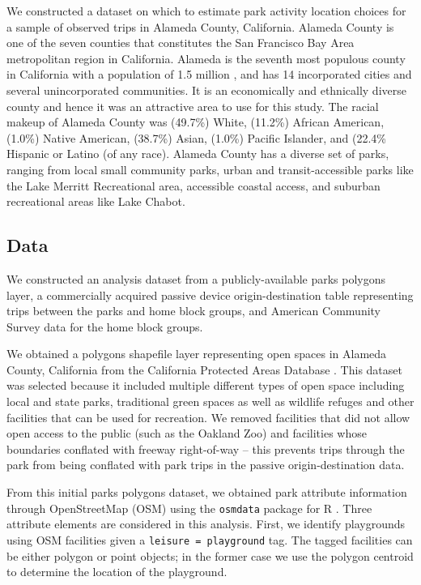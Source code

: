 \documentclass[]{elsarticle} %
\begin{document}
We constructed a dataset on which to estimate park activity location choices for
a sample of observed trips in Alameda County, California. Alameda County is one
of the seven counties that constitutes the San Francisco Bay Area metropolitan
region in California. Alameda is the seventh most populous county in California
with a population of 1.5 million \citep{alamedafacts}, and has 14 incorporated cities
and several unincorporated communities. It is an economically and ethnically
diverse county and hence it was an attractive area to use for this study. The
racial makeup of Alameda County was (49.7\%) White, (11.2\%) African American,
(1.0\%) Native American, (38.7\%) Asian, (1.0\%) Pacific Islander, and (22.4\%
Hispanic or Latino (of any race). Alameda County has a diverse set of parks,
ranging from local small community parks, urban and transit-accessible parks
like the Lake Merritt Recreational area, accessible coastal access, and suburban
recreational areas like Lake Chabot.

\hypertarget{data}{%
\subsection{Data}\label{data}}

We constructed an analysis dataset from a publicly-available parks polygons
layer, a commercially acquired passive device origin-destination table
representing trips between the parks and home block groups, and American
Community Survey data for the home block groups.

We obtained a polygons shapefile layer representing open spaces in Alameda
County, California from the California Protected Areas Database \citep{cpad2019}.
This dataset was selected because it included multiple different types of open
space including local and state parks, traditional green spaces as well as
wildlife refuges and other facilities that can be used for recreation. We
removed facilities that did not allow open access to the public (such as the
Oakland Zoo) and facilities whose boundaries conflated with freeway right-of-way
-- this prevents trips through the park from being conflated with park trips in
the passive origin-destination data.

From this initial parks polygons dataset, we obtained park attribute information
through OpenStreetMap (OSM) using the \texttt{osmdata} package for R \citep{osmdata}. Three
attribute elements are considered in this analysis. First, we identify playgrounds
using OSM facilities given a \texttt{leisure\ =\ playground} tag. The tagged facilities can
be either polygon or point objects; in the former case we use the polygon centroid
to determine the location of the playground.
\end{document}
